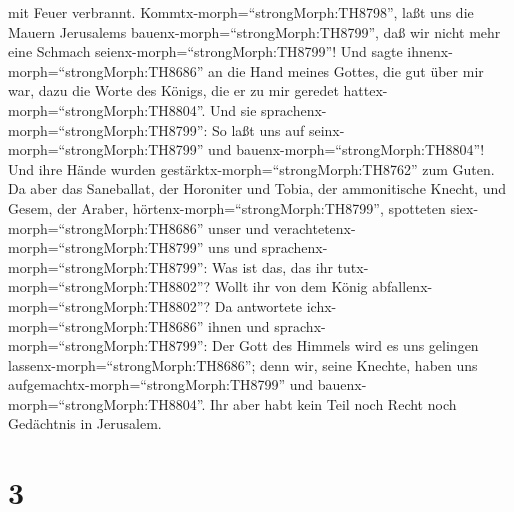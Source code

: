 mit Feuer verbrannt. Kommtx-morph=``strongMorph:TH8798'', laßt uns die
Mauern Jerusalems bauenx-morph=``strongMorph:TH8799'', daß wir nicht
mehr eine Schmach seienx-morph=``strongMorph:TH8799''!  Und
sagte ihnenx-morph=``strongMorph:TH8686'' an die Hand meines Gottes, die
gut über mir war, dazu die Worte des Königs, die er zu mir geredet
hattex-morph=``strongMorph:TH8804''. Und sie
sprachenx-morph=``strongMorph:TH8799'': So laßt uns auf
seinx-morph=``strongMorph:TH8799'' und
bauenx-morph=``strongMorph:TH8804''! Und ihre Hände wurden
gestärktx-morph=``strongMorph:TH8762'' zum Guten.  Da aber
das Saneballat, der Horoniter und Tobia, der ammonitische Knecht, und
Gesem, der Araber, hörtenx-morph=``strongMorph:TH8799'', spotteten
siex-morph=``strongMorph:TH8686'' unser und
verachtetenx-morph=``strongMorph:TH8799'' uns und
sprachenx-morph=``strongMorph:TH8799'': Was ist das, das ihr
tutx-morph=``strongMorph:TH8802''? Wollt ihr von dem König
abfallenx-morph=``strongMorph:TH8802''?  Da antwortete
ichx-morph=``strongMorph:TH8686'' ihnen und
sprachx-morph=``strongMorph:TH8799'': Der Gott des Himmels wird es uns
gelingen lassenx-morph=``strongMorph:TH8686''; denn wir, seine Knechte,
haben uns aufgemachtx-morph=``strongMorph:TH8799'' und
bauenx-morph=``strongMorph:TH8804''. Ihr aber habt kein Teil noch Recht
noch Gedächtnis in Jerusalem.

\hypertarget{section-2}{%
\section{3}\label{section-2}}


